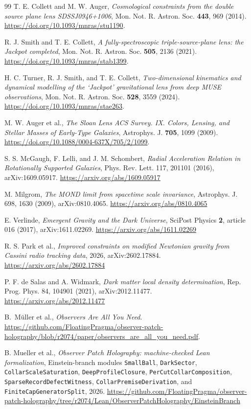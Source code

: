 \documentclass[11pt]{article}
\begin{document}
\begin{thebibliography}{99}
T. E. Collett and M. W. Auger, \emph{Cosmological constraints from the
double source plane lens SDSSJ0946+1006}, Mon. Not. R. Astron. Soc.
\textbf{443}, 969 (2014). \url{https://doi.org/10.1093/mnras/stu1190}.

R. J. Smith and T. E. Collett, \emph{A fully-spectroscopic
triple-source-plane lens: the Jackpot completed},
Mon. Not. R. Astron. Soc. \textbf{505}, 2136 (2021).
\url{https://doi.org/10.1093/mnras/stab1399}.

H. C. Turner, R. J. Smith, and T. E. Collett, \emph{Two-dimensional
kinematics and dynamical modelling of the `Jackpot' gravitational lens
from deep MUSE observations}, Mon. Not. R. Astron. Soc. \textbf{528},
3559 (2024). \url{https://doi.org/10.1093/mnras/stae263}.

M. W. Auger et al., \emph{The Sloan Lens ACS Survey. IX. Colors, Lensing,
and Stellar Masses of Early-Type Galaxies}, Astrophys. J. \textbf{705}, 1099
(2009). \url{https://doi.org/10.1088/0004-637X/705/2/1099}.

S. S. McGaugh, F. Lelli, and J. M. Schombert,
\emph{Radial Acceleration Relation in Rotationally Supported Galaxies},
Phys. Rev. Lett. 117, 201101 (2016), arXiv:1609.05917.
\url{https://arxiv.org/abs/1609.05917}

M. Milgrom,
\emph{The MOND limit from spacetime scale invariance},
Astrophys. J. 698, 1630 (2009), arXiv:0810.4065.
\url{https://arxiv.org/abs/0810.4065}

E. Verlinde,
\emph{Emergent Gravity and the Dark Universe},
SciPost Physics \textbf{2}, article 016 (2017), arXiv:1611.02269.
\url{https://arxiv.org/abs/1611.02269}

R. S. Park et al.,
\emph{Improved constraints on modified Newtonian gravity from Cassini radio tracking data},
2026, arXiv:2602.17884.
\url{https://arxiv.org/abs/2602.17884}

P. F. de Salas and A. Widmark,
\emph{Dark matter local density determination},
Rep. Prog. Phys. 84, 104901 (2021), arXiv:2012.11477.
\url{https://arxiv.org/abs/2012.11477}

B.~M\"uller et al., \emph{Observers Are All You Need}.
\url{https://github.com/FloatingPragma/observer-patch-holography/blob/r2074/paper/observers_are_all_you_need.pdf}.

B. Mueller et al.,
\emph{Observer Patch Holography: machine-checked Lean formalization},
Einstein-branch modules \texttt{SmallBall}, \texttt{DarkSector},
\texttt{CollarScaleSaturation}, \texttt{DeepProfileClosure},
\texttt{PerCutCollarComposition}, \texttt{SparseRecordDefectWitness},
\texttt{CollarPremiseDerivation}, and \texttt{FiniteCapGeneratorSplit},
2026.
\url{https://github.com/FloatingPragma/observer-patch-holography/tree/r2074/Lean/ObserverPatchHolography/EinsteinBranch}


\end{thebibliography}
\end{document}
